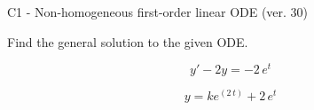 \begin{exercise}
  \begin{exerciseTitle}C1 - Non-homogeneous first-order linear ODE (ver. 30)\end{exerciseTitle}
  \begin{exerciseStatement}
    
Find the general solution to the given ODE.

    
\[y'-2y= -2 \, e^{t}\]

  \end{exerciseStatement}
  \begin{exerciseAnswer}
    
\[y= k e^{\left(2 \, t\right)} + 2 \, e^{t}\]

  \end{exerciseAnswer}
\end{exercise}